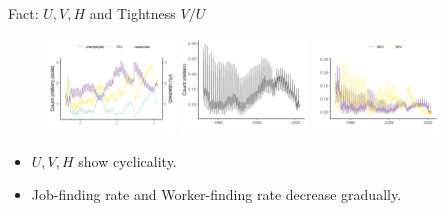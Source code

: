 \documentclass[aspectratio=169]{beamer}
\begin{document}
\begin{frame}{Fact: $U,V,H$ and Tightness $V/U$}
    \begin{figure}[!ht]
  \begin{center}
  \includegraphics[width = 0.3\textwidth]
  {figuretable/unemployed_vacancy_month_aggregate.png}
  \includegraphics[width = 0.3\textwidth]
  {figuretable/hire_month_aggregate.png}
  \includegraphics[width = 0.3\textwidth]
  {figuretable/job_finding_rate_worker_finding_rate_month_aggregate.png}
  \end{center}
  \footnotesize
\end{figure} 
\begin{itemize}
    \item $U,V,H$ show cyclicality.
    \item Job-finding rate and Worker-finding rate decrease gradually.
\end{itemize}
\end{frame}
\end{document}

